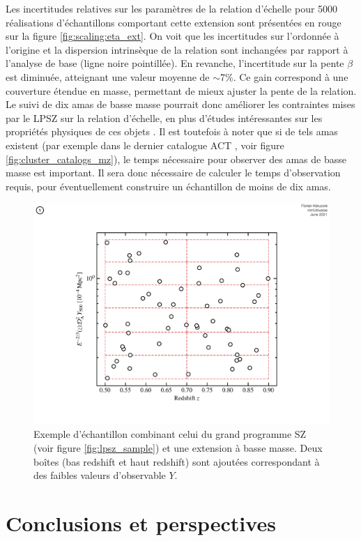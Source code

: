 Les incertitudes relatives sur les paramètres de la relation d'échelle pour 5000 réalisations d'échantillons comportant cette extension sont présentées en rouge sur la figure \ref{fig:scaling:eta_ext}.
On voit que les incertitudes sur l'ordonnée à l'origine et la dispersion intrinsèque de la relation sont inchangées par rapport à l'analyse de base (ligne noire pointillée).
En revanche, l'incertitude sur la pente $\beta$ est diminuée, atteignant une valeur moyenne de $\sim$7\%.
Ce gain correspond à une couverture étendue en masse, permettant de mieux ajuster la pente de la relation.
Le suivi de dix amas de basse masse pourrait donc améliorer les contraintes mises par le LPSZ sur la relation d'échelle, en plus d'études intéressantes sur les propriétés physiques de ces objets \cite{keruzore_exploiting_2020}.
Il est toutefois à noter que si de tels amas existent (par exemple dans le dernier catalogue ACT \cite{hilton_atacama_2021}, voir figure \ref{fig:cluster_catalogs_mz}), le temps nécessaire pour observer des amas de basse masse est important.
Il sera donc nécessaire de calculer le temps d'observation requis, pour éventuellement construire un échantillon de moins de dix amas.

\begin{figure}[t]
    \centering
    \includegraphics[width=.6\linewidth]{Figures/Chap_scaling/lowm_bin.pdf}
    \caption{
        Exemple d'échantillon combinant celui du grand programme SZ (voir figure \ref{fig:lpsz_sample}) et une extension à basse masse.
        Deux boîtes (bas redshift et haut redshift) sont ajoutées correspondant à des faibles valeurs d'observable $Y$.
    }
    \label{fig:scaling:lpsz_lowm}
\end{figure}

\section{Conclusions et perspectives}

